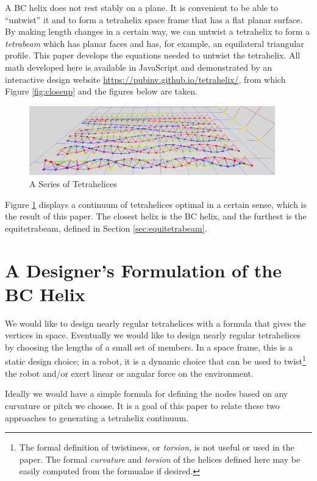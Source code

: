 \documentclass[11pt]{article}
\begin{document}
A BC helix does not rest stably on a plane. It is convenient to
be able to ``untwist'' it and to form a tetrahelix space frame that has a
flat planar surface. By making length changes in a certain way, we can
untwist a tetrahelix to form a \emph{tetrabeam} which has planar faces
and has, for example, an equilateral triangular profile. This paper
develops the equations needed to untwist the tetrahelix. All math
developed here is available in JavaScript and demonstrated by an interactive
design website \url{https://pubinv.github.io/tetrahelix/}\cite{readtetrahelix},
from which Figure \ref{fig:closeup} and
the figures below are taken.

\begin{figure}
  \centering
     \includegraphics[width=0.95\textwidth]{figures/TetrahelixSeries.png}
     \caption{A Series of Tetrahelices}
  \label{fig:series}
\end{figure}


Figure \ref{fig:series} displays a continuum of tetrahelices optimal in a certain sense, which is the result of this
paper. The closest helix is the BC helix, and the furthest
is the equitetrabeam, defined in Section \ref{sec:equitetrabeam}.

\section{A Designer's Formulation of the BC Helix}

We would like to design nearly regular tetrahelices with a formula that
gives the vertices in space. Eventually we would like to design nearly regular
tetrahelices by choosing the lengths of a small set of members.
In a space frame, this is a static design choice; in a robot, it is a
dynamic choice that can be used to twist\footnote{The formal definition of twistiness, or \emph{torsion},
is not useful or used in the paper. The formal \emph{curvature} and \emph{torsion} of the helices defined here
may be easily computed from the formualae if desired.} the robot and/or exert linear or
angular force on the environment.

Ideally we would have a simple formula for defining the nodes based on
any curvature or pitch we choose. It is a goal of
this paper to relate these two approaches to generating a tetrahelix
continuum.
\end{document}
